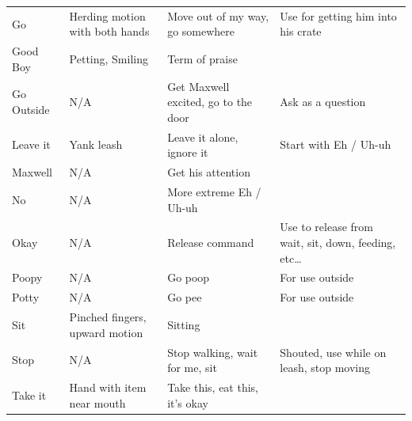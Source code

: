 \documentclass[pdftex,12pt]{article}
\begin{document}
\begin{table}[H]
\begin{adjustwidth}{-4.5cm}{-4.5cm}
\begin{center}
\begin{tabular}{lp{}p{}p{}}
        Go          & Herding motion with both hands                   & Move out of my way, go somewhere                      & Use for getting him into his crate                                 \\
        Good Boy    & Petting, Smiling                                 & Term of praise                                        &                                                                    \\
        Go Outside  & N/A                                              & Get Maxwell excited, go to the door                   & Ask as a question                    \\
        Leave it    & Yank leash                                       & Leave it alone, ignore it                             & Start with Eh / Uh-uh                                              \\
        Maxwell     & N/A                                              & Get his attention                                     &                                                                    \\
        No          & N/A                                              & More extreme Eh / Uh-uh                               &                                                                    \\
        Okay        & N/A                                              & Release
        command                                       & Use to release from
        wait, sit, down, feeding, etc\ldots                \\
        Poopy       & N/A                                              & Go poop                               & For use outside                                                    \\
        Potty       & N/A                                              & Go pee                                & For use outside                                                    \\
        Sit         & Pinched fingers, upward motion                   & Sitting                                               &                                                                    \\
        Stop        & N/A                                              & Stop walking, wait for me, sit                        & Shouted, use while on leash, stop moving                           \\
        Take it     & Hand with item near mouth                        & Take this, eat this, it's okay                        &                                                                    \\

\end{tabular}
\end{center}
\end{adjustwidth}
\end{table}
\end{document}

